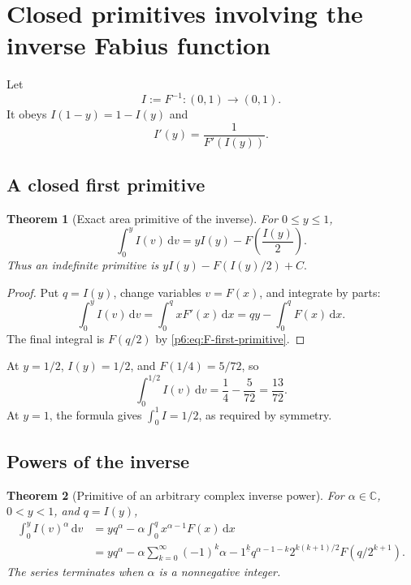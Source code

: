 \documentclass[11pt,oneside]{article}
\newtheorem{theorem}{Theorem}[section]
\theoremstyle{definition}
\theoremstyle{remark}
\newcommand{\C}{\mathbb C}
\newcommand{\dd}{\,\mathrm d}
\newcommand{\fall}[2]{#1^{\underline{#2}}}
\newcommand{\1}{\mathbf 1}
\begin{document}
\section{Closed primitives involving the inverse Fabius function}

Let
\begin{equation}
 I:=F^{-1}:(0,1)\to(0,1).                                 \label{p6:eq:inverse-def}
\end{equation}
It obeys \(I(1-y)=1-I(y)\) and
\begin{equation}
 I'(y)=\frac1{F'(I(y))}.                                  \label{p6:eq:inverse-derivative}
\end{equation}

\subsection{A closed first primitive}

\begin{theorem}[Exact area primitive of the inverse]
\label{p6:thm:inverse-primitive}
For \(0\le y\le1\),
\begin{equation}
 \boxed{
 \int_0^y I(v)\dd v
 =yI(y)-F\!\left(\frac{I(y)}2\right).
 }                                                        \label{p6:eq:inverse-primitive-closed}
\end{equation}
Thus an indefinite primitive is
\(
 yI(y)-F(I(y)/2)+C.
\)
\end{theorem}

\begin{proof}
Put \(q=I(y)\), change variables \(v=F(x)\), and integrate by parts:
\[
 \int_0^yI(v)\dd v
 =\int_0^q xF'(x)\dd x
 =qy-\int_0^qF(x)\dd x.
\]
The final integral is \(F(q/2)\) by \eqref{p6:eq:F-first-primitive}.
\end{proof}

At \(y=1/2\), \(I(y)=1/2\), and \(F(1/4)=5/72\), so
\begin{equation}
 \int_0^{1/2}I(v)\dd v=\frac14-\frac5{72}=\frac{13}{72}. \label{p6:eq:inverse-half-area}
\end{equation}
At \(y=1\), the formula gives \(\int_0^1I=1/2\), as required by symmetry.

\subsection{Powers of the inverse}

\begin{theorem}[Primitive of an arbitrary complex inverse power]
\label{p6:thm:inverse-power-primitive}
For \(\alpha\in\C\), \(0<y<1\), and \(q=I(y)\),
\begin{align}
 \int_0^yI(v)^\alpha\dd v
 &=yq^\alpha-\alpha\int_0^qx^{\alpha-1}F(x)\dd x          \label{p6:eq:inverse-power-basic}\\
 &=yq^\alpha-\alpha\sum_{k=0}^{\infty}(-1)^k
   \fall{\alpha-1}{k}q^{\alpha-1-k}
   2^{k(k+1)/2}F(q/2^{k+1}).                              \label{p6:eq:inverse-power-series}
\end{align}
The series terminates when \(\alpha\) is a nonnegative integer.
\end{theorem}
\end{document}
